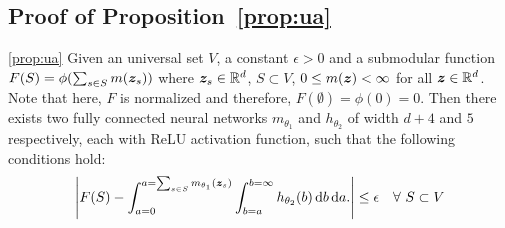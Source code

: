 \documentclass{article}
\def\d{\mathrm{d}}
\begin{document}
\subsection{Proof of Proposition~\ref{prop:ua}}
 \begin{numproposition}{\ref{prop:ua}}
Given an universal set $V$, a constant $\epsilon>0$ and a submodular function $F(S) = \phi(\sum_{s\in S} m(\bm{z}_s))$  where   $\bm{z}_s \in \mathbb{R}^d$, $S\subset V$, $0 \le m(\bm{z}) < \infty$ for all $\bm{z} \in \mathbb{R}^d$. Note that here, $F$ is normalized and therefore, $F(\emptyset)=\phi(0)=0$. Then there exists two fully connected neural networks   $m_{\theta_1}$  and $h_{\theta_2} $   of width $d+4$ and $5$ respectively, each with ReLU activation function, such that the following conditions hold:
\begin{align}
   \left|F(S) -   \int_{a=0} ^{a=\sum_{s\in S}m_{\theta_1}(\zb_s)} \int_{b=a} ^{b=\infty} h_{\theta_2}(b) \, \d b \, \d a. \right|    \le \epsilon \quad \forall \ S\subset V\label{eq:ua}
\end{align}
\end{numproposition}
 
\end{document}
